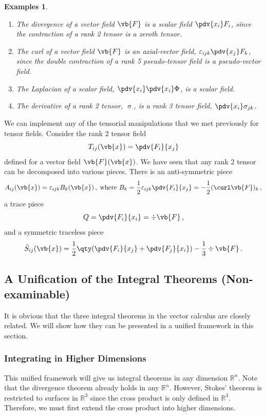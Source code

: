 \documentclass{article}
\theoremstyle{plain}\theoremheaderfont{\normalfont\itshape}\theorembodyfont{\rmfamily}\theoremseparator{.}\newtheorem*{rem}{Remark}\newtheorem*{ex}{Example}\newtheorem*{proof}{Proof}\newtheorem*{altp}{Alternative proof}
\theoremstyle{plain}\theoremheaderfont{\normalfont\bfseries}\theorembodyfont{\rmfamily}\theoremseparator{.}\newtheorem{thm}{Theorem}[section]\newtheorem{lem}[thm]{Lemma}\newtheorem{prop}[thm]{Proposition}\newtheorem*{cor}{Corollary}\newtheorem{defn}[thm]{Definition}\newtheorem{clm}[thm]{Claim}\newtheorem{clminproof}{Claim}
\theoremstyle{break}\theoremheaderfont{\normalfont\itshape}\theorembodyfont{\rmfamily}\theoremseparator{.\medskip}\newtheorem*{proofskip}{Proof}\newtheorem*{exs}{Examples}\newtheorem*{rems}{Remarks}
\theoremstyle{break}\theoremheaderfont{\normalfont\bfseries}\theorembodyfont{\rmfamily}\theoremseparator{.\medskip}\newtheorem{lemskip}[thm]{Lemma}\newtheorem{defnskip}[thm]{Definition}\newtheorem{propskip}[thm]{Proposition}\newtheorem{thmskip}[thm]{Theorem}
\numberwithin{equation}{section}
\begin{document}
	\begin{exs}
		\begin{enumerate}[topsep=0pt]
			\item The divergence of a vector field \(\vb{F}\) is a scalar field \(\pdv{x_i} F_i\), since the contraction of a rank 2 tensor is a zeroth tensor.
			\item The curl of a vector field \(\vb{F}\) is an axial-vector field, \(\varepsilon_{ijk}\pdv{x_j}F_k\), since the double contraction of a rank 5 pseudo-tensor field is a pseudo-vector field.
			\item The Laplacian of a scalar field, \(\pdv{x_i}\pdv{x_i}\Phi\), is a scalar field.
			\item The derivative of a rank 2 tensor, \(\upsigma\), is a rank 3 tensor field, \(\pdv{x_i}\sigma_{jk}\).
		\end{enumerate}
	\end{exs}

	We can implement any of the tensorial manipulations that we met previously for tensor fields. Consider the rank 2 tensor field
	\[T_{ij}(\vb{x})=\pdv{F_i}{x_j}\]
	defined for a vector field \(\vb{F}(\vb{x})\). We have seen that any rank 2 tensor can be decomposed into various pieces.	There is an anti-symmetric piece
	\[A_{ij}(\vb{x})=\varepsilon_{ijk}B_k(\vb{x})\,,\;\text{where }B_k=\frac{1}{2}\varepsilon_{ijk}\pdv{F_i}{x_j}=-\frac{1}{2}(\curl\vb{F})_k\,,\]
	a trace piece
	\[Q=\pdv{F_i}{x_i}=\div\vb{F}\,,\]
	and a symmetric traceless piece
	\[\tilde{S}_{ij}(\vb{x})=\frac{1}{2}\qty(\pdv{F_i}{x_j}+\pdv{F_j}{x_i})-\frac{1}{3}\div\vb{F}\,.\]
	\subsection{A Unification of the Integral Theorems (Non-examinable)}
	It is obvious that the three integral theorems in the vector calculus are closely related. We will show how they can be presented in a unified framework in this section.
	\subsubsection{Integrating in Higher Dimensions}
	This unified framework will give us integral theorems in any dimension \(\mathbb{R}^n\). Note that the divergence theorem already holds in any \(\mathbb{R}^n\). However, Stokes' theorem is restricted to surfaces in \(\mathbb{R}^3\) since the cross product is only defined in \(\mathbb{R}^3\). Therefore, we must first extend the cross product into higher dimensions.
\end{document}
